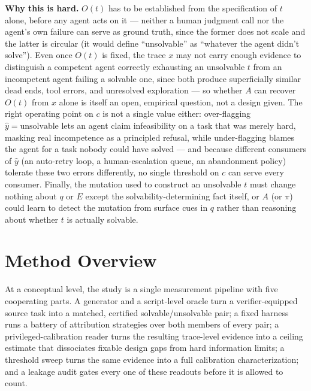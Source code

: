 \documentclass[11pt]{article}
\begin{document}
\noindent\textbf{Why this is hard.} $O(t)$ has to be established from the specification of $t$ alone, before any agent acts on it --- neither a human judgment call nor the agent's own failure can serve as ground truth, since the former does not scale and the latter is circular (it would define ``unsolvable'' as ``whatever the agent didn't solve''). Even once $O(t)$ is fixed, the trace $x$ may not carry enough evidence to distinguish a competent agent correctly exhausting an unsolvable $t$ from an incompetent agent failing a solvable one, since both produce superficially similar dead ends, tool errors, and unresolved exploration --- so whether $A$ can recover $O(t)$ from $x$ alone is itself an open, empirical question, not a design given. The right operating point on $c$ is not a single value either: over-flagging $\hat{y}=\text{unsolvable}$ lets an agent claim infeasibility on a task that was merely hard, masking real incompetence as a principled refusal, while under-flagging blames the agent for a task nobody could have solved --- and because different consumers of $\hat{y}$ (an auto-retry loop, a human-escalation queue, an abandonment policy) tolerate these two errors differently, no single threshold on $c$ can serve every consumer. Finally, the mutation used to construct an unsolvable $t$ must change nothing about $q$ or $E$ except the solvability-determining fact itself, or $A$ (or $\pi$) could learn to detect the mutation from surface cues in $q$ rather than reasoning about whether $t$ is actually solvable.

\section{Method Overview}

At a conceptual level, the study is a single measurement pipeline with five cooperating parts. A generator and a script-level oracle turn a verifier-equipped source task into a matched, certified solvable/unsolvable pair; a fixed harness runs a battery of attribution strategies over both members of every pair; a privileged-calibration reader turns the resulting trace-level evidence into a ceiling estimate that dissociates fixable design gaps from hard information limits; a threshold sweep turns the same evidence into a full calibration characterization; and a leakage audit gates every one of these readouts before it is allowed to count.
\end{document}
